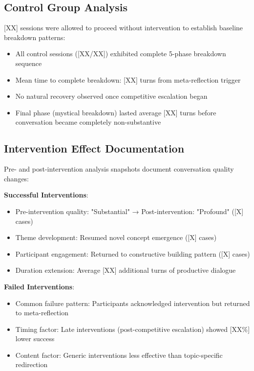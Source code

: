 \documentclass[11pt,letterpaper]{article}
\begin{document}
\subsection{Control Group Analysis}

[XX] sessions were allowed to proceed without intervention to establish baseline breakdown patterns:
\begin{itemize}
    \item All control sessions ([XX/XX]) exhibited complete 5-phase breakdown sequence
    \item Mean time to complete breakdown: [XX] turns from meta-reflection trigger
    \item No natural recovery observed once competitive escalation began
    \item Final phase (mystical breakdown) lasted average [XX] turns before conversation became completely non-substantive
\end{itemize}

\subsection{Intervention Effect Documentation}

Pre- and post-intervention analysis snapshots document conversation quality changes:

\textbf{Successful Interventions}:
\begin{itemize}
    \item Pre-intervention quality: "Substantial" → Post-intervention: "Profound" ([X] cases)
    \item Theme development: Resumed novel concept emergence ([X] cases)
    \item Participant engagement: Returned to constructive building pattern ([X] cases)
    \item Duration extension: Average [XX] additional turns of productive dialogue
\end{itemize}

\textbf{Failed Interventions}:
\begin{itemize}
    \item Common failure pattern: Participants acknowledged intervention but returned to meta-reflection
    \item Timing factor: Late interventions (post-competitive escalation) showed [XX\%] lower success
    \item Content factor: Generic interventions less effective than topic-specific redirection
\end{itemize}
\end{document}
